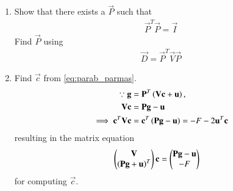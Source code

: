 \documentclass[journal,12pt,twocolumn]{IEEEtran}
\renewcommand\thesection{\arabic{section}}
\begin{document}
\begin{enumerate}[label=\thesection.\arabic*
,ref=\thesection.\theenumi]
\solution Substituting \eqref{eq:parab_affine} in \eqref{eq:parab_gen},
\begin{align}
\brak{\vec{P}\vec{y}+\vec{c}}^T\vec{V}\brak{\vec{P}\vec{y}+\vec{c}}+2\vec{u}^T\brak{\vec{P}\vec{y}+\vec{c}}+ F = 0, 
\end{align}
which can be expressed as
\begin{multline}
\implies \vec{y}^T\vec{P}^T\vec{V}\vec{P}\vec{y}+2\brak{\vec{V}\vec{c}+\vec{u}}^T\vec{P}\vec{y}
\\
+ F+ \vec{c}^T\vec{V}\vec{c} + 2\vec{u}^T\vec{c} = 0
\label{eq:parab_simp}
\end{multline}
%
Comparing \eqref{eq:parab_simp} with \eqref{eq:parab_mat} \eqref{eq:parab_parmas} is obtained.
%
\item Show that there exists a $\vec{P}$ such that 
\begin{align}
\vec{P}^T\vec{P} = \vec{I}
\end{align}
%
Find $\vec{P}$ using
\begin{align}
\vec{D} = \vec{P}^T\vec{V}\vec{P}
\end{align}
\item Find $\vec{c}$ from \eqref{eq:parab_parmas}.
\\
\solution 
\begin{align}
\because \mathbf{g} &= \mathbf{P}^T\left(\mathbf{V}\mathbf{c}+\mathbf{u}\right),
\\
\mathbf{V}\mathbf{c}&= \mathbf{P}\mathbf{g} - \mathbf{u}
\\
\implies \mathbf{c}^T\mathbf{V}\mathbf{c} &= \mathbf{c}^T\left(\mathbf{P}\mathbf{g} - \mathbf{u}\right) = -F- 2\mathbf{u}^T\mathbf{c}
\end{align}
%
resulting in the matrix equation
\begin{align}
\begin{pmatrix}\mathbf{V}\\ \left(\mathbf{P}\mathbf{g} + \mathbf{u}\right)^T\end{pmatrix}\mathbf{c}&= \begin{pmatrix}\mathbf{P}\mathbf{g} - \mathbf{u}\\ -F\end{pmatrix}
\end{align}
%
for computing $\vec{c}$.
\end{enumerate}
\end{document}
